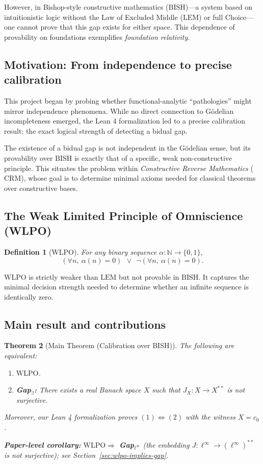 \documentclass[11pt]{article}  %
\newtheorem{theorem}{Theorem}[section]
\newtheorem{definition}[theorem]{Definition}
\newenvironment{thm}{\begin{theorem}}{\end{theorem}}
\newenvironment{defi}{\begin{definition}}{\end{definition}}
\newtheorem{theorem}{Theorem}[section]
\newtheorem{definition}[theorem]{Definition}
\newenvironment{thm}{\begin{theorem}}{\end{theorem}}
\newenvironment{defi}{\begin{definition}}{\end{definition}}
\newcommand{\N}{\mathbb{N}}
\newcommand{\linf}{\ell^\infty}
\newcommand{\WLPO}{\mathrm{WLPO}}
\newcommand{\BISH}{\mathrm{BISH}}
\newcommand{\CRM}{\mathrm{CRM}}
\newcommand{\LEM}{\mathrm{LEM}}
\begin{document}
However, in Bishop-style constructive mathematics ($\BISH$)---a system based on intuitionistic logic without the Law of Excluded Middle ($\LEM$) or full Choice---one cannot prove that this gap exists for either space. This dependence of provability on foundations exemplifies \emph{foundation relativity}.

\subsection{Motivation: From independence to precise calibration}

This project began by probing whether functional-analytic ``pathologies'' might mirror independence phenomena. While no direct connection to G\"odelian incompleteness emerged, the Lean 4 formalization led to a precise calibration result: the exact logical strength of detecting a bidual gap.

The existence of a bidual gap is not independent in the G\"odelian sense, but its provability over $\BISH$ is exactly that of a specific, weak non-constructive principle. This situates the problem within \emph{Constructive Reverse Mathematics} ($\CRM$), whose goal is to determine minimal axioms needed for classical theorems over constructive bases.

\subsection{The Weak Limited Principle of Omniscience (WLPO)}

\begin{defi}[$\WLPO$]
For any binary sequence $\alpha:\N\to\{0,1\}$,
\[
(\forall n,\ \alpha(n)=0)\ \ \vee\ \ \neg(\forall n,\ \alpha(n)=0).
\]
\end{defi}

$\WLPO$ is strictly weaker than $\LEM$ but not provable in $\BISH$. It captures the minimal decision strength needed to determine whether an infinite sequence is identically zero.

\subsection{Main result and contributions}

\begin{thm}[Main Theorem (Calibration over BISH)]
The following are equivalent:
\begin{enumerate}
\item $\WLPO$.
\item \textbf{Gap$_{\exists}$:} There exists a real Banach space $X$ such that $J_X:X\to X^{**}$ is not surjective.
\end{enumerate}
Moreover, our Lean 4 formalization proves $(1) \Leftrightarrow (2)$ with the witness $X=c_0$.

\noindent\textbf{Paper-level corollary:} $\WLPO \Rightarrow$ \textbf{Gap$_{\linf}$} (the embedding $J:\linf\to(\linf)^{**}$ is not surjective); see Section~\ref{sec:wlpo-implies-gap}.
\end{thm}
\end{document}

